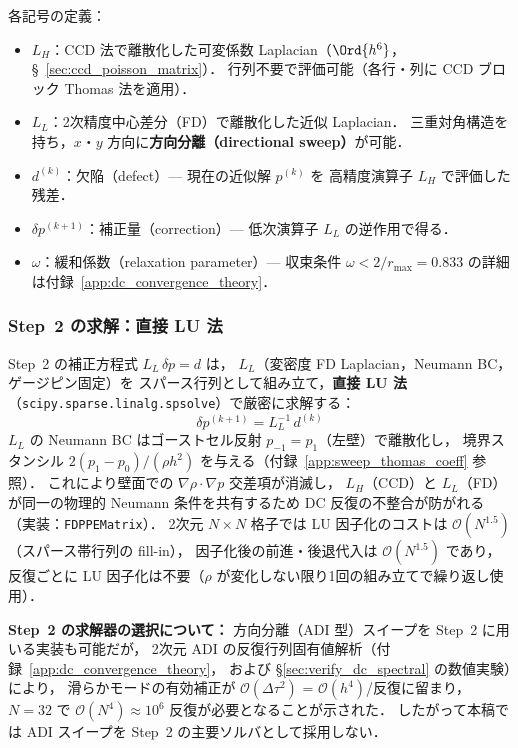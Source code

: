 各記号の定義：
\begin{itemize}
  \item $L_H$：CCD 法で離散化した可変係数 Laplacian（$\Ord{h^6}$，§~\ref{sec:ccd_poisson_matrix}）．
        行列不要で評価可能（各行・列に CCD ブロック Thomas 法を適用）．
  \item $L_L$：2次精度中心差分（FD）で離散化した近似 Laplacian．
        三重対角構造を持ち，$x$・$y$ 方向に\textbf{方向分離（directional sweep）}が可能．
  \item $d^{(k)}$：欠陥（defect）— 現在の近似解 $p^{(k)}$ を
        高精度演算子 $L_H$ で評価した残差．
  \item $\delta p^{(k+1)}$：補正量（correction）— 低次演算子 $L_L$ の逆作用で得る．
  \item $\omega$：緩和係数（relaxation parameter）—
        収束条件 $\omega < 2/r_{\max} = 0.833$ の詳細は付録~\ref{app:dc_convergence_theory}．
\end{itemize}

\subsubsection{Step~2 の求解：直接 LU 法}
\label{sec:dc_sweep}

Step~2 の補正方程式 $L_L\,\delta p = d$ は，
$L_L$（変密度 FD Laplacian，Neumann BC，ゲージピン固定）を
スパース行列として組み立て，\textbf{直接 LU 法}（\texttt{scipy.sparse.linalg.spsolve}）で厳密に求解する：
\begin{equation}
  \delta p^{(k+1)} = L_L^{-1}\,d^{(k)}
  \label{eq:dc_step2_lu}
\end{equation}
$L_L$ の Neumann BC はゴーストセル反射 $p_{-1}=p_1$（左壁）で離散化し，
境界スタンシル $2(p_1-p_0)/(\rho h^2)$ を与える（付録~\ref{app:sweep_thomas_coeff} 参照）．
これにより壁面での $\nabla\rho\cdot\nabla p$ 交差項が消滅し，
$L_H$（CCD）と $L_L$（FD）が同一の物理的 Neumann 条件を共有するため
DC 反復の不整合が防がれる（実装：\texttt{FDPPEMatrix}）．
2次元 $N\times N$ 格子では LU 因子化のコストは $\mathcal{O}(N^{1.5})$（スパース帯行列の fill-in），
因子化後の前進・後退代入は $\mathcal{O}(N^{1.5})$ であり，
反復ごとに LU 因子化は不要（$\rho$ が変化しない限り1回の組み立てで繰り返し使用）．

\noindent\textbf{Step~2 の求解器の選択について：}
方向分離（ADI 型）スイープを Step~2 に用いる実装も可能だが，
2次元 ADI の反復行列固有値解析（付録~\ref{app:dc_convergence_theory}，
および §\ref{sec:verify_dc_spectral} の数値実験）により，
滑らかモードの有効補正が $\mathcal{O}(\Delta\tau^2)$ = $\mathcal{O}(h^4)$/反復に留まり，
$N = 32$ で $\mathcal{O}(N^4) \approx 10^6$ 反復が必要となることが示された．
したがって本稿では ADI スイープを Step~2 の主要ソルバとして採用しない．

